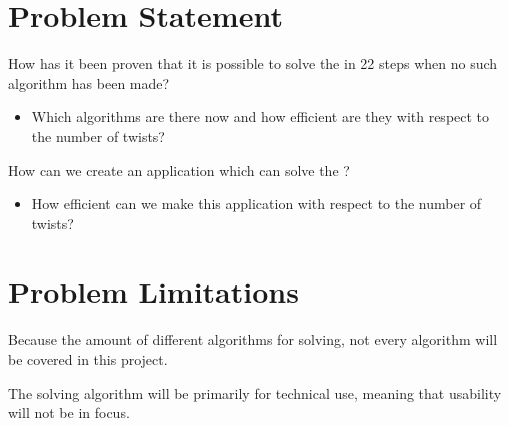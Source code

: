 %


\section{Problem Statement}
How has it been proven that it is possible to solve the \rubik{} in 22 steps when no such algorithm has been made?
\begin{itemize}
	\item Which algorithms are there now and how efficient are they with respect to the number of twists?
\end{itemize}
How can we create an application which can solve the \rubik{}?
\begin{itemize}
	\item How efficient can we make this application with respect to the number of twists?
\end{itemize}

\section{Problem Limitations}
Because the amount of different algorithms for \rubik{} solving, not every algorithm will be covered in this project.

The \rubik{} solving algorithm will be primarily for technical use, meaning that usability will not be in focus.